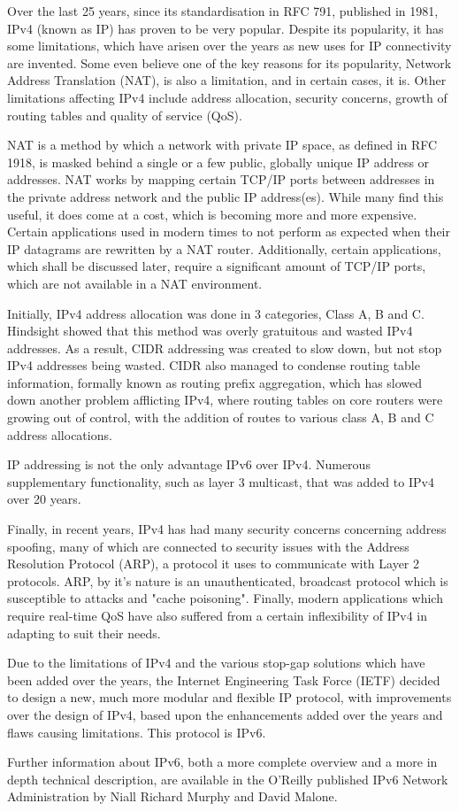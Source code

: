 
Over the last 25 years, since its standardisation in RFC 791, published
in 1981, IPv4 (known as IP) has proven to be very popular. Despite its 
popularity, it has some limitations, which have arisen over the years 
as new uses for IP connectivity are invented. Some even believe one of 
the key reasons for its popularity, Network Address Translation (NAT), 
is also a limitation, and in certain cases, it is. Other limitations
affecting IPv4 include address allocation, security concerns, growth of 
routing tables and quality of service (QoS).


NAT is a method by which a network with private IP space, as defined in
RFC 1918, is masked behind a single or a few public, globally unique IP
address or addresses. NAT works by mapping certain TCP/IP ports between
addresses in the private address network and the public IP address(es).
While many find this useful, it does come at a cost, which is becoming
more and more expensive. Certain applications used in modern times to
not perform as expected when their IP datagrams are rewritten by a NAT
router. Additionally, certain applications, which shall be discussed
later, require a significant amount of TCP/IP ports, which are not
available in a NAT environment.


Initially, IPv4 address allocation was done in 3 categories, Class A, B
and C. Hindsight showed that this method was overly gratuitous and
wasted IPv4 addresses. As a result, CIDR addressing was created to slow 
down, but not stop IPv4 addresses being wasted. CIDR also managed to condense 
routing table information, formally known as routing prefix aggregation, 
which has slowed down another problem afflicting IPv4, where routing tables 
on core routers were growing out of control, with the addition of routes to
various class A, B and C address allocations.


IP addressing is not the only advantage IPv6 over IPv4. Numerous
supplementary functionality, such as layer 3 multicast, that was added to IPv4 over 20 years.

Finally, in recent years, IPv4 has had many security concerns concerning
address spoofing, many of which are connected to security issues with
the Address Resolution Protocol (ARP), a protocol it uses to communicate
with Layer 2 protocols. ARP, by it's nature is an unauthenticated, 
broadcast protocol which is susceptible to attacks and "cache poisoning".
Finally, modern applications which require real-time QoS have also 
suffered from a certain inflexibility of IPv4 in adapting to suit their 
needs.


Due to the limitations of IPv4 and the various stop-gap solutions which
have been added over the years, the Internet Engineering Task Force
(IETF) decided to design a new, much more modular and flexible IP
protocol, with improvements over the design of IPv4, based upon the
enhancements added over the years and flaws causing limitations. This
protocol is IPv6.


Further information about IPv6, both a more complete overview and
a more in depth technical description, are available in the O'Reilly
published IPv6 Network Administration by Niall Richard Murphy and 
David Malone.

